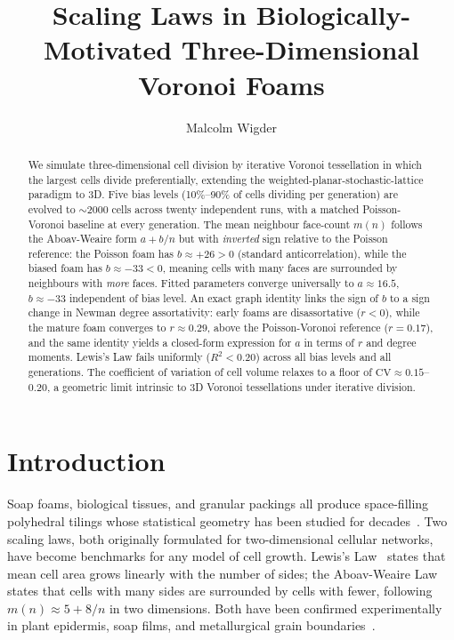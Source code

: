 \documentclass[aps,pre,reprint,amsmath,amssymb,floatfix]{revtex4-2}
\begin{document}
\title{Scaling Laws in Biologically-Motivated Three-Dimensional Voronoi Foams}

\author{Malcolm Wigder}

\begin{abstract}
We simulate three-dimensional cell division by iterative Voronoi tessellation
in which the largest cells divide preferentially, extending the
weighted-planar-stochastic-lattice paradigm to 3D.
Five bias levels (10\%--90\% of cells dividing per generation) are evolved to
$\sim$2000 cells across twenty independent runs, with a matched
Poisson-Voronoi baseline at every generation.
The mean neighbour face-count $m(n)$ follows the Aboav-Weaire form $a+b/n$
but with \emph{inverted} sign relative to the Poisson reference: the
Poisson foam has $b\approx+26>0$ (standard anticorrelation), while the
biased foam has $b\approx-33<0$, meaning cells with many faces are
surrounded by neighbours with \emph{more} faces.
Fitted parameters converge universally to $a\approx 16.5$, $b\approx -33$
independent of bias level.
An exact graph identity links the sign of $b$ to a sign change in Newman
degree assortativity: early foams are disassortative ($r<0$), while the
mature foam converges to $r\approx 0.29$, above the Poisson-Voronoi
reference ($r=0.17$), and the same identity yields a closed-form expression
for $a$ in terms of $r$ and degree moments.
Lewis's Law fails uniformly ($R^2<0.20$) across all bias levels and
all generations.
The coefficient of variation of cell volume relaxes to a floor of
$\mathrm{CV}\approx 0.15$--$0.20$, a geometric limit intrinsic to 3D
Voronoi tessellations under iterative division.
\end{abstract}

\maketitle

\section{Introduction}

Soap foams, biological tissues, and granular packings all produce space-filling
polyhedral tilings whose statistical geometry has been studied for
decades~\cite{weaire1984,rivier1985}.
Two scaling laws, both originally formulated for two-dimensional cellular
networks, have become benchmarks for any model of cell growth.
Lewis's Law~\cite{lewis1926} states that mean cell area grows linearly with
the number of sides; the Aboav-Weaire Law~\cite{aboav1970,weaire1974} states
that cells with many sides are surrounded by cells with fewer, following
$m(n)\approx 5+8/n$ in two dimensions.
Both have been confirmed experimentally in plant epidermis, soap films, and
metallurgical grain boundaries~\cite{glazier1987}.
\end{document}
